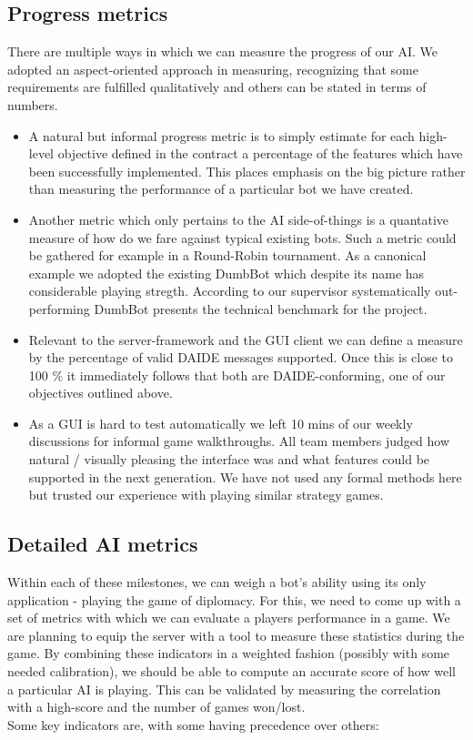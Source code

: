 \documentclass[pdftex,12pt,a4paper]{report}
\begin{document}
\subsection{Progress metrics}
There are multiple ways in which we can measure the progress of our
AI.  We adopted an aspect-oriented approach in measuring, recognizing
that some requirements are fulfilled qualitatively and others can be
stated in terms of numbers.

\begin{itemize}
\item A natural but informal progress metric is to simply estimate for
  each high-level objective defined in the contract a percentage of
  the features which have been successfully implemented. This places
  emphasis on the big picture rather than measuring the performance of
  a particular bot we have created.
\item Another metric which only pertains to the AI side-of-things is a
  quantative measure of how do we fare against typical existing
  bots. Such a metric could be gathered for example in a Round-Robin
  tournament.  As a canonical example we adopted the existing DumbBot
  which despite its name has considerable playing stregth. According
  to our supervisor systematically out-performing DumbBot presents the
  technical benchmark for the project.
\item Relevant to the server-framework and the GUI client we can
  define a measure by the percentage of valid DAIDE messages
  supported. Once this is close to 100 \% it immediately follows that
  both are DAIDE-conforming, one of our objectives outlined above.
\item As a GUI is hard to test automatically we left 10 mins of our
  weekly discussions for informal game walkthroughs. All team members
  judged how natural / visually pleasing the interface was and what
  features could be supported in the next generation. We have not used
  any formal methods here but trusted our experience with playing
  similar strategy games.
\end{itemize}

\subsection{Detailed AI metrics}

Within each of these milestones, we can weigh a bot's ability using
its only application - playing the game of diplomacy. For this, we
need to come up with a set of metrics with which we can evaluate a
players performance in a game. We are planning to equip the server
with a tool to measure these statistics during the game. By combining
these indicators in a weighted fashion (possibly with some needed
calibration), we should be able to compute an accurate score of how
well a particular AI is playing. This can be validated by measuring
the correlation with a high-score and the number of games won/lost.
\\ Some key indicators are, with some having precedence over others:
\end{document}
